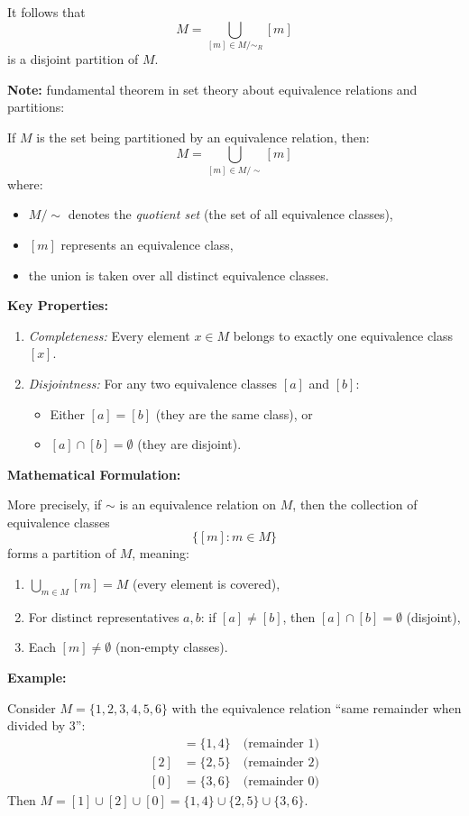 \documentclass[12pt,a4paper]{article}
\theoremstyle{plain}
\theoremstyle{definition}
\theoremstyle{remark}
\begin{document}
It follows that
\[
	M = \bigcup_{[m]\in M/\!\sim_R} [m]
\]
is a disjoint partition of $M$.

\medskip
\textbf{Note:} fundamental theorem in set theory about equivalence relations and partitions:

If $M$ is the set being partitioned by an equivalence relation, then:
\[
	M = \bigcup_{[m] \in M/\sim} [m]
\]
where:
\begin{itemize}[leftmargin=*]
	\item $M/\sim$ denotes the \emph{quotient set} (the set of all equivalence classes),
	\item $[m]$ represents an equivalence class,
	\item the union is taken over all distinct equivalence classes.
\end{itemize}

\textbf{Key Properties:}
\begin{enumerate}[leftmargin=*]
	\item \emph{Completeness:} Every element $x \in M$ belongs to exactly one equivalence class $[x]$.
	\item \emph{Disjointness:} For any two equivalence classes $[a]$ and $[b]$:
		\begin{itemize}
			\item Either $[a] = [b]$ (they are the same class), or
			\item $[a] \cap [b] = \emptyset$ (they are disjoint).
		\end{itemize}
\end{enumerate}

\textbf{Mathematical Formulation:}

More precisely, if $\sim$ is an equivalence relation on $M$, then the collection of equivalence classes
\[
	\{[m] : m \in M\}
\]
forms a partition of $M$, meaning:
\begin{enumerate}[leftmargin=*]
	\item $\bigcup_{m \in M} [m] = M$ (every element is covered),
	\item For distinct representatives $a, b$: if $[a] \neq [b]$, then $[a] \cap [b] = \emptyset$ (disjoint),
	\item Each $[m] \neq \emptyset$ (non-empty classes).
\end{enumerate}

\textbf{Example:}

Consider $M = \{1, 2, 3, 4, 5, 6\}$ with the equivalence relation ``same remainder when divided by 3'':
\begin{align*}
	[1] &= \{1, 4\} \quad \text{(remainder 1)} \\
	[2] &= \{2, 5\} \quad \text{(remainder 2)} \\
	[0] &= \{3, 6\} \quad \text{(remainder 0)}
\end{align*}
Then $M = [1] \cup [2] \cup [0] = \{1, 4\} \cup \{2, 5\} \cup \{3, 6\}$.
\end{document}
